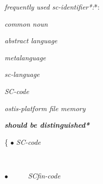 \documentclass{article}
\begin{document}
\begin{multicols}{2}
\begin{description}[ labelwidth=0.75cm]
\begin{description}[ labelwidth=0.75cm]
  \item [$\Rightarrow$] \textit{frequently used sc-identifier*:}*:\par
[sc.fin-text]
    \begin{description}[ labelwidth=0.75cm]
     \vspace{-0.1cm}
     \item [$\in$] \textit{common noun}
    \end{description}
        \vspace{-0.2cm}
    \item [$\in$] \textit{abstract language}
    \item [$\in$] \textit{metalanguage}
    \item [$\in$] \textit{sc-language}
    \item [\subset] \textit{SC-code}
    \item [\supset] \textit{ostis-platform file memory}

\end{description}

\noindent\textbf{\textit{should be distinguished*}}

\begin{description}[ labelwidth=0.75cm]
\vspace{-0.3cm}
\item [$\ni$] \{ $\bullet$ \hspace{14pt} \textit{SC-code}
\end{description}


\begin{description}[ labelwidth=0.75cm]
\vspace{-0.6cm}
\leftskip=2.2cm \item[:=] [Universal language of internal semantic representation of knowledge in memory of ostis-systems]
\
\end{description}


\begin{description}[ labelwidth=0.75cm]
\item \hspace{4.2pt} $\bullet$  \ \ \ \ \   \textit{SCfin-code}
\end{description}

\begin{description}[ labelwidth=0.75cm]
\vspace{-0.6cm}
\leftskip=2.2cm \item[:=][Metalanguage for describing the
representation of external information constructions that do not
belong to the SC-code in ostisplatform file memory]


\end{description}
\end{description}
\end{multicols}
\end{document}
